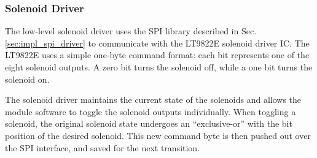 

\subsubsection{Solenoid Driver}

The low-level solenoid driver uses the SPI library described in Sec. \ref{sec:impl_spi_driver} to communicate with the LT9822E solenoid driver IC. The LT9822E uses a simple one-byte command format: each bit represents one of the eight solenoid outputs. A zero bit turns the solenoid off, while a one bit turns the solenoid on. 

The solenoid driver maintains the current state of the solenoids and allows the module software to toggle the solenoid outputs individually. When toggling a solenoid, the original solenoid state undergoes an ``exclusive-or'' with the bit position of the desired solenoid. This new command byte is then pushed out over the SPI interface, and saved for the next transition.
